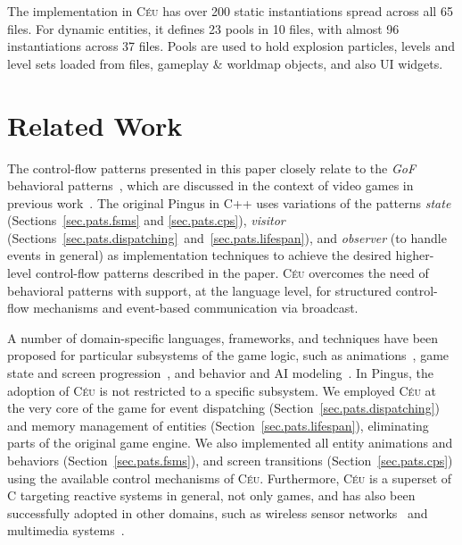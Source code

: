 \documentclass[times,twocolumn,final]{elsarticle}
\newcommand{\CEU}{\textsc{C\'{e}u}\xspace}
\newcommand{\code}[1] {{\small{\texttt{#1}}}}
\begin{document}
The implementation in \CEU has over 200 static instantiations spread across all
65 files.
For dynamic entities, it defines 23 pools in 10 files, with almost 96
instantiations across 37 files.
Pools are used to hold explosion particles, levels and level sets loaded from
files, gameplay \& worldmap objects, and also UI widgets.

\section{Related Work}
\label{sec.related}

The control-flow patterns presented in this paper closely relate to the
\emph{GoF} behavioral patterns~\cite{gof}, which are discussed in the context
of video games in previous
work~\cite{games.patterns,games.gof.2015,games.gof.2007}.
%
The original Pingus in C++ uses variations of the patterns
    \emph{state} (Sections~\ref{sec.pats.fsms} and \ref{sec.pats.cps}),
    \emph{visitor} (Sections~\ref{sec.pats.dispatching}~and~\ref{sec.pats.lifespan}), and
    \emph{observer} (to handle events in general)
as implementation techniques to achieve the desired higher-level
control-flow patterns described in the paper.
%
\CEU overcomes the need of behavioral patterns with support, at the language
level, for structured control-flow mechanisms and event-based communication via
broadcast.
%

A number of domain-specific languages, frameworks, and techniques have been
proposed for particular subsystems of the game logic, such as
animations~\cite{games.anims.2006,games.anims.2003,games.anims.1996,games.anims.1982},
game state and screen progression~\cite{games.fsms.2006.1,games.fsms.2006.2}, and
behavior and AI modeling~\cite{games.bts,games.bts.unreal}.
%
In Pingus, the adoption of \CEU is not restricted to a specific subsystem.
We employed \CEU at the very core of the game for event dispatching
(Section~\ref{sec.pats.dispatching}) and memory management of entities
(Section~\ref{sec.pats.lifespan}), eliminating parts of the original game
engine.
We also implemented all entity animations and behaviors
(Section~\ref{sec.pats.fsms}), and screen transitions
(Section~\ref{sec.pats.cps})
using the available control mechanisms of \CEU.
%
Furthermore, \CEU is a superset of C targeting reactive systems in general, not
only games, and has also been successfully adopted in other domains, such as
    wireless sensor networks~\cite{ceu.sensys13,ceu.terra} and
    multimedia systems~\cite{ceumedia.webmedia16}.
\end{document}
